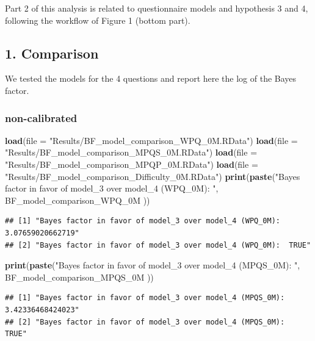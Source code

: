 \documentclass[
]{article}
\newenvironment{Shaded}{\begin{snugshade}}{\end{snugshade}}
\newcommand{\AttributeTok}[1]{\textcolor[rgb]{0.13,0.29,0.53}{#1}}
\newcommand{\FunctionTok}[1]{\textcolor[rgb]{0.13,0.29,0.53}{\textbf{#1}}}
\newcommand{\NormalTok}[1]{#1}
\newcommand{\StringTok}[1]{\textcolor[rgb]{0.31,0.60,0.02}{#1}}
\begin{document}
Part 2 of this analysis is related to questionnaire models and
hypothesis 3 and 4, following the workflow of Figure 1 (bottom part).

\hypertarget{comparison-1}{%
\subsection{1. Comparison}\label{comparison-1}}

We tested the models for the 4 questions and report here the log of the
Bayes factor.

\hypertarget{non-calibrated}{%
\subsubsection{non-calibrated}\label{non-calibrated}}

\begin{Shaded}
\begin{Highlighting}[]
\FunctionTok{load}\NormalTok{(}\AttributeTok{file =} \StringTok{"Results/BF\_model\_comparison\_WPQ\_0M.RData"}\NormalTok{)}
\FunctionTok{load}\NormalTok{(}\AttributeTok{file =} \StringTok{"Results/BF\_model\_comparison\_MPQS\_0M.RData"}\NormalTok{)}
\FunctionTok{load}\NormalTok{(}\AttributeTok{file =} \StringTok{"Results/BF\_model\_comparison\_MPQP\_0M.RData"}\NormalTok{)}
\FunctionTok{load}\NormalTok{(}\AttributeTok{file =} \StringTok{"Results/BF\_model\_comparison\_Difficulty\_0M.RData"}\NormalTok{)}
\FunctionTok{print}\NormalTok{(}\FunctionTok{paste}\NormalTok{(}\StringTok{"Bayes factor in favor of model\_3 over model\_4 (WPQ\_0M): "}\NormalTok{, BF\_model\_comparison\_WPQ\_0M ))}
\end{Highlighting}
\end{Shaded}

\begin{verbatim}
## [1] "Bayes factor in favor of model_3 over model_4 (WPQ_0M):  3.07659020662719"
## [2] "Bayes factor in favor of model_3 over model_4 (WPQ_0M):  TRUE"
\end{verbatim}

\begin{Shaded}
\begin{Highlighting}[]
\FunctionTok{print}\NormalTok{(}\FunctionTok{paste}\NormalTok{(}\StringTok{"Bayes factor in favor of model\_3 over model\_4 (MPQS\_0M): "}\NormalTok{, BF\_model\_comparison\_MPQS\_0M ))}
\end{Highlighting}
\end{Shaded}

\begin{verbatim}
## [1] "Bayes factor in favor of model_3 over model_4 (MPQS_0M):  3.42336468424023"
## [2] "Bayes factor in favor of model_3 over model_4 (MPQS_0M):  TRUE"
\end{verbatim}
\end{document}
